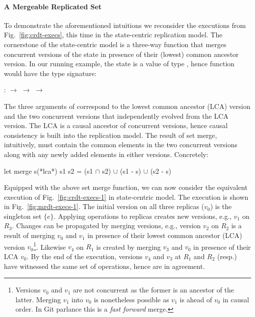 \noindent\paragraph{A Mergeable Replicated Set} To demonstrate the
aforementioned intuitions we reconsider the executions from
Fig.~\ref{fig:crdt-execs}, this time in the state-centric replication
model. The cornerstone of the state-centric model is a three-way
 function that merges concurrent versions of the state in
presence of their (lowest) common ancestor version. In our running
example, the state is a value of type , hence 
function would have the type signature:
\begin{center}
 :  $\rightarrow$  $\rightarrow$ 
$\rightarrow$ 
\end{center}
The three arguments of  correspond to the lowest common
ancestor (LCA) version and the two concurrent versions that
independently evolved from the LCA version. The LCA is a causal
ancestor of concurrent versions, hence causal consistency is built
into the replication model. The result of set merge, intuitively, must
contain the common elements in the two concurrent versions along with
any newly added elements in either versions. Concretely:
\begin{ocaml}
  let merge s(*lca*) s1 s2 = 
              (s1 $\cap$ s2) $\cup$ (s1 - s) $\cup$ (s2 - s)
\end{ocaml}
Equipped with the above set merge function, we can now consider the
equivalent execution of Fig.~\ref{fig:crdt-execs-1} in state-centric
model. The execution is shown in Fig.~\ref{fig:mrdt-execs-1}. The
initial version on all three replicas ($v_0$) is the singleton set
$\{e\}$. Applying operations to replicas creates new versions, e.g.,
$v_1$ on $R_3$. Changes can be propagated by merging versions, e.g.,
version $v_2$ on $R_2$ is a result of merging $v_0$ and $v_1$ in
presence of their lowest common ancestor (LCA) version
$v_0$\footnote{Versions $v_0$ and $v_1$ are not concurrent as the
  former is an ancestor of the latter. Merging $v_1$ into $v_0$ is
  nonetheless possible as $v_1$ is ahead of $v_0$ in causal order. In
  Git parlance this is a \emph{fast forward} merge.}.
Likewise $v_4$ on $R_1$ is created by merging $v_3$ and $v_0$ in
presence of their LCA $v_0$. By the end of the execution, versions
$v_4$ and $v_3$ at $R_1$ and $R_2$ (resp.) have witnessed the same set
of operations, hence are in agreement.

